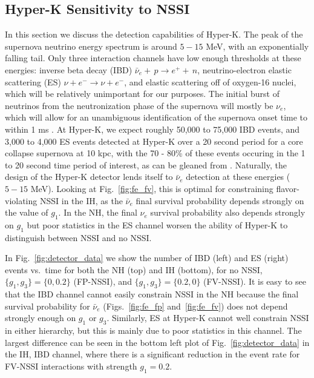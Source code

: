 \documentclass[a4paper,12pt]{article}
\begin{document}
\subsection{Hyper-K Sensitivity to NSSI}
In this section we discuss the detection capabilities of Hyper-K. The peak of the supernova neutrino energy spectrum is around  $5-15$ MeV, with an exponentially falling tail. Only three interaction channels have low enough thresholds at these energies: inverse beta decay (IBD) $\bar{\nu}_{e} +\,p \rightarrow e^{+} +\,n$, neutrino-electron elastic scattering (ES) $\nu + e^{-} \rightarrow \nu + e^{-}$, and elastic scattering off of oxygen-16 nuclei, which will be relatively unimportant for our purposes. The initial burst of neutrinos from the neutronization phase of the supernova will mostly be $\nu_{e}$, which will allow for an unambiguous identification of the supernova onset time to within 1 ms \cite{Abe:2018uyc}. At Hyper-K, we expect roughly 50,000 to 75,000 IBD events, and 3,000 to 4,000 ES events detected at Hyper-K over a 20 second period for a core collapse supernova at 10 kpc, with the 70 - 80\% of these events occuring in the 1 to 20 second time period of interest, as can be gleaned from \cite{Abe:2018uyc}. Naturally, the design of the Hyper-K detector lends itself to $\bar{\nu}_{e}$ detection at these energies ($5-15$ MeV). Looking at Fig.~\ref{fig:fe_fv}, this is optimal for constraining flavor-violating NSSI in the IH, as the $\bar{\nu}_{e}$ final survival probability depends strongly on the value of $g_{1}$. In the NH, the final $\nu_{e}$ survival probability also depends strongly on $g_{1}$ but poor statistics in the ES channel worsen the ability of Hyper-K to distinguish between NSSI and no NSSI. 

In Fig.~\ref{fig:detector_data} we show the number of IBD (left) and ES (right) events vs.\ time for both the NH (top) and IH (bottom), for no NSSI, $\{g_{1}, g_{3}\} = \{0, 0.2\}$ (FP-NSSI), and $\{g_{1}, g_{3}\} = \{0.2, 0\}$ (FV-NSSI). It is easy to see that the IBD channel cannot easily constrain NSSI in the NH because the final survival probability for $\bar{\nu}_{e}$ (Figs.~\ref{fig:fe_fp} and~\ref{fig:fe_fv}) does not depend strongly enough on $g_{1}$ or $g_{3}$. Similarly, ES at Hyper-K cannot well constrain NSSI in either hierarchy, but this is mainly due to poor statistics in this channel. The largest difference can be seen in the bottom left plot of Fig.~\ref{fig:detector_data} in the IH, IBD channel, where there is a significant reduction in the event rate for FV-NSSI interactions with strength $g_{1} = 0.2$. 
\end{document}
